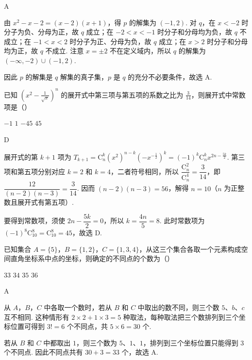 \begin{answer}
A
\end{answer}

\begin{solution}
由 \(x^2-x-2=(x-2)(x+1)\)，得 \(p\) 的解集为 \((-1,2)\). 对 \(q\)，在 \(x<-2\) 时分子为负、分母为正，故 \(q\) 成立；在 \(-2<x<-1\) 时分子和分母均为负，故 \(q\) 不成立；在 \(-1<x<2\) 时分子为正、分母为负，故 \(q\) 成立；在 \(x>2\) 时分子和分母均为正，故 \(q\) 不成立. 注意 \(x=\pm2\) 不在定义域内，所以 \(q\) 的解集为 \((-\infty,-2)\cup(-1,2)\).

因此 \(p\) 的解集是 \(q\) 解集的真子集，\(p\) 是 \(q\) 的充分不必要条件，故选 A.
\end{solution}

\begin{problem}
已知 \(\left(x^{2} - \frac{1}{\sqrt{x}}\right)^{n}\) 的展开式中第三项与第五项的系数之比为 \(\frac{3}{14}\)，则展开式中常数项是（\quad）

\choices
    {\(-1\)}
    {\(1\)}
    {\(-45\)}
    {\(45\)}
\end{problem}

\begin{answer}
D
\end{answer}

\begin{solution}
展开式的第 \(k+1\) 项为 \(T_{k+1}=\mathrm C_n^k(x^2)^{n-k}(-x^{-\frac{1}{2}})^k=(-1)^k\mathrm C_n^k x^{2n-\frac{5k}{2}}\). 第三项和第五项分别对应 \(k=2\) 和 \(k=4\)，二者符号相同，所以 \(\dfrac{\mathrm C_n^2}{\mathrm C_n^4}=\dfrac{3}{14}\)，即 \(\dfrac{12}{(n-2)(n-3)}=\dfrac{3}{14}\). 因而 \((n-2)(n-3)=56\)，解得 \(n=10\)（\(n\) 为正整数且展开式有第五项）.

要得到常数项，须使 \(2n-\dfrac{5k}{2}=0\)，所以 \(k=\dfrac{4n}{5}=8\). 此时常数项为 \((-1)^8\mathrm C_{10}^8=\mathrm C_{10}^8=45\)，故选 D.
\end{solution}

\begin{problem}
已知集合 \(A = \{5\}\)，\(B = \{1, 2\}\)，\(C = \{1, 3, 4\}\)，从这三个集合各取一个元素构成空间直角坐标系中点的坐标，则确定的不同点的个数为（\quad）

\choices
    {\(33\)}
    {\(34\)}
    {\(35\)}
    {\(36\)}
\end{problem}

\begin{answer}
A
\end{answer}

\begin{solution}
从 \(A\)，\(B\)，\(C\) 中各取一个数时，若从 \(B\) 和 \(C\) 中取出的数不同，则三个数 \(5\)、\(b\)、\(c\) 互不相同. 这种情形有 \(2\times2+1\times3=5\) 种取法，每种取法把三个数排列到三个坐标位置可得到 \(3!=6\) 个不同点，共 \(5\times6=30\) 个.

若从 \(B\) 和 \(C\) 中都取出 \(1\)，则三个数为 \(5\)、\(1\)、\(1\)，排列到三个坐标位置只能得到 \(3\) 个不同点. 因此不同点共有 \(30+3=33\) 个，故选 A.
\end{solution}

